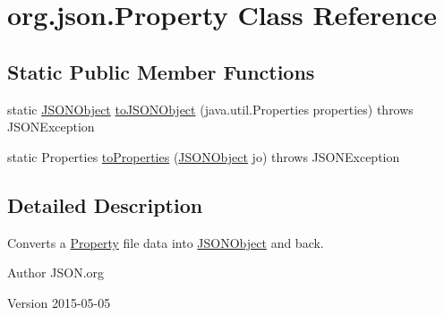 \hypertarget{classorg_1_1json_1_1Property}{\section{org.\-json.\-Property Class Reference}
\label{classorg_1_1json_1_1Property}
}
\subsection*{Static Public Member Functions}
\begin{DoxyCompactItemize}
\item 
static \hyperlink{classorg_1_1json_1_1JSONObject}{J\-S\-O\-N\-Object} \hyperlink{classorg_1_1json_1_1Property_aaf04335208523a4f7b41eb9edf3939fb}{to\-J\-S\-O\-N\-Object} (java.\-util.\-Properties properties)  throws J\-S\-O\-N\-Exception 
\item 
static Properties \hyperlink{classorg_1_1json_1_1Property_adbaf75a2454e0563ba90f9adc2822850}{to\-Properties} (\hyperlink{classorg_1_1json_1_1JSONObject}{J\-S\-O\-N\-Object} jo)  throws J\-S\-O\-N\-Exception 
\end{DoxyCompactItemize}


\subsection{Detailed Description}
Converts a \hyperlink{classorg_1_1json_1_1Property}{Property} file data into \hyperlink{classorg_1_1json_1_1JSONObject}{J\-S\-O\-N\-Object} and back. \begin{DoxyAuthor}{Author}
J\-S\-O\-N.\-org 
\end{DoxyAuthor}
\begin{DoxyVersion}{Version}
2015-\/05-\/05 
\end{DoxyVersion}


